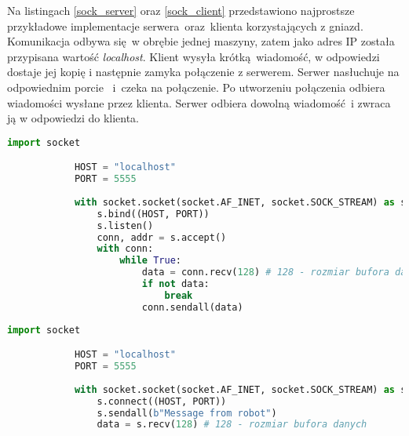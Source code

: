 {{        Na listingach \ref{sock_server} oraz \ref{sock_client} przedstawiono najprostsze przykładowe implementacje serwera~oraz~klienta korzystających z gniazd. Komunikacja odbywa się w obrębie jednej maszyny, zatem jako adres IP została przypisana wartość \textit{localhost}. Klient wysyła krótką wiadomość, w odpowiedzi dostaje jej kopię i następnie zamyka połączenie z serwerem. Serwer nasłuchuje na odpowiednim porcie~
        i~czeka na połączenie. Po utworzeniu połączenia odbiera wiadomości wysłane przez klienta. Serwer odbiera dowolną wiadomość i zwraca ją w odpowiedzi do klienta. 

        \newpage
        \begin{lstlisting}[caption=Przykładowa implementacja serwera za pomocą gniazd w języku Python, language=Python, label=sock_server]
            import socket

            HOST = "localhost"
            PORT = 5555 
            
            with socket.socket(socket.AF_INET, socket.SOCK_STREAM) as s:
                s.bind((HOST, PORT))
                s.listen()
                conn, addr = s.accept()
                with conn:
                    while True:
                        data = conn.recv(128) # 128 - rozmiar bufora danych
                        if not data:
                            break
                        conn.sendall(data)
        \end{lstlisting}

        \begin{lstlisting}[caption=Przykładowa implementacja klienta za pomocą gniazd w języku Python, language=Python, label=sock_client]
            import socket

            HOST = "localhost"  
            PORT = 5555  
            
            with socket.socket(socket.AF_INET, socket.SOCK_STREAM) as s:
                s.connect((HOST, PORT))
                s.sendall(b"Message from robot")
                data = s.recv(128) # 128 - rozmiar bufora danych
        \end{lstlisting}
    }
}

